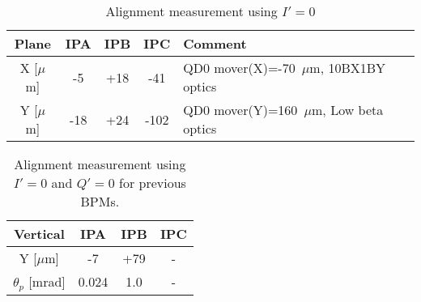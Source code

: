 \begin{table}[h]
\centering
 \begin{tabular}{c||c|c|c|l}\hline
  Plane & IPA & IPB & IPC & Comment\\\hline\hline
  X [$\mu$m] & -5 & +18 & -41 & QD0 mover(X)=-70~$\mu$m, 10BX1BY optics\\
  Y [$\mu$m] & -18 & +24 & -102 & QD0 mover(Y)=160~$\mu$m, Low beta optics\\\hline
 \end{tabular}\caption{Alignment measurement using $I'=0$}\label{t:newalign}
\end{table}
\begin{table}[h]
\centering
 \begin{tabular}{c||c|c|c}\hline
 Vertical & IPA &IPB & IPC \\\hline\hline
 Y [$\mu$m] & -7 & +79 & - \\
 $\theta_p$ [mrad] & 0.024 & 1.0& -\\\hline
 \end{tabular}\caption{Alignment measurement using $I'=0$ and $Q'=0$ for previous BPMs.}\label{t:oldbpms}
\end{table}
